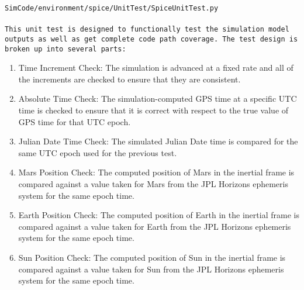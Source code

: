 \documentclass[]{LASPreport}
\begin{document}
\noindent
{\tt SimCode/environment/spice/UnitTest/SpiceUnitTest.py \\
\\

\noindent This unit test is designed to functionally test the simulation model 
outputs as well as get complete code path coverage.  The test design is broken 
up into several parts:\\
\begin{enumerate}
\item{Time Increment Check: The simulation is advanced at a fixed rate and all 
   of the increments are checked to ensure that they are consistent.}
\item{Absolute Time Check: The simulation-computed GPS time at a specific UTC 
  time is checked to ensure that it is correct with respect to the true value 
  of GPS time for that UTC epoch.}
\item{Julian Date Time Check: The simulated Julian Date time is compared for the 
   same UTC epoch used for the previous test.}
\item{Mars Position Check: The computed position of Mars in the inertial frame 
   is compared against a value taken for Mars from the JPL Horizons ephemeris 
   system for the same epoch time.}
\item{Earth Position Check: The computed position of Earth in the inertial frame 
   is compared against a value taken for Earth from the JPL Horizons ephemeris 
   system for the same epoch time.}
\item{Sun Position Check: The computed position of Sun in the inertial frame 
   is compared against a value taken for Sun from the JPL Horizons ephemeris 
   system for the same epoch time.}
\end{enumerate}


}
\end{document}
